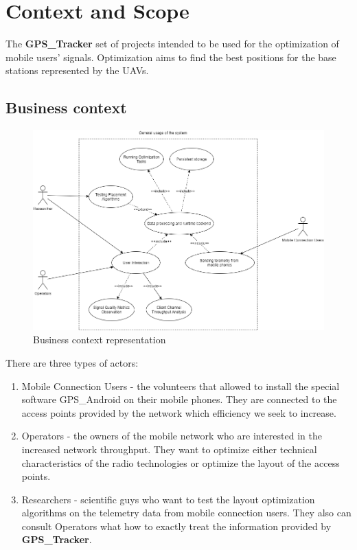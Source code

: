 \hypertarget{context-and-scope}{%
\section{Context and Scope}\label{context-and-scope}}

The \textbf{GPS\_Tracker} set of projects intended to be used for the
optimization of mobile users' signals. Optimization aims to find the
best positions for the base stations represented by the UAVs.

\hypertarget{business-context}{%
\subsection{Business context}\label{business-context}}

\begin{figure}
\centering
\includegraphics{schemes/use-case/Main-Usage-Use-Case.png}
\caption{Business context representation}
\end{figure}

There are three types of actors:

\begin{enumerate}
\def\labelenumi{\arabic{enumi}.}
\tightlist
\item
  Mobile Connection Users - the volunteers that allowed to install the
  special software GPS\_Android on their mobile phones. They are
  connected to the access points provided by the network which
  efficiency we seek to increase.
\item
  Operators - the owners of the mobile network who are interested in the
  increased network throughput. They want to optimize either technical
  characteristics of the radio technologies or optimize the layout of
  the access points.
\item
  Researchers - scientific guys who want to test the layout optimization
  algorithms on the telemetry data from mobile connection users. They
  also can consult Operators what how to exactly treat the information
  provided by \textbf{GPS\_Tracker}.
\end{enumerate}

